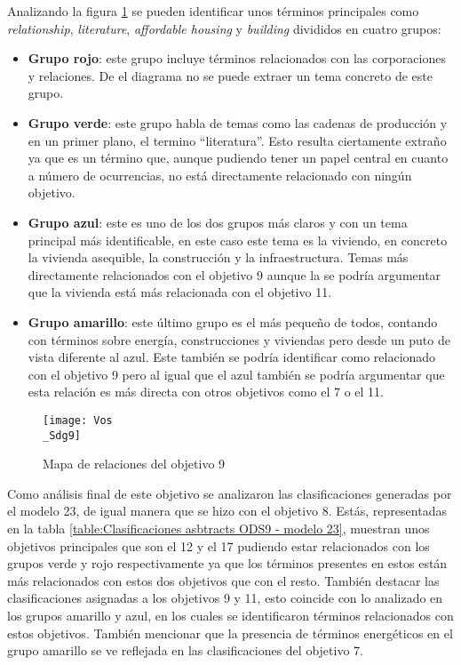 Analizando la figura \cref{Mapa de relaciones del objetivo 9} se pueden identificar unos
términos principales como \textit{relationship}, \textit{literature},
\textit{affordable housing} y \textit{building} divididos en cuatro grupos:
\begin{itemize}
    \item \textbf{Grupo rojo}: este grupo incluye términos relacionados con las
    corporaciones y relaciones. De el diagrama no se puede extraer un tema
    concreto de este grupo. 
    \item \textbf{Grupo verde}: este grupo habla de temas como las cadenas de
    producción y en un primer plano, el termino ``literatura''. Esto resulta
    ciertamente extraño ya que es un término que, aunque pudiendo tener un papel
    central en cuanto a número de ocurrencias, no está directamente relacionado
    con ningún objetivo.
    \item \textbf{Grupo azul}: este es uno de los dos grupos más claros y con un
    tema principal más identificable, en este caso este tema es la viviendo, en
    concreto la vivienda asequible, la construcción y la infraestructura. Temas
    más directamente relacionados con el objetivo 9 aunque la se podría
    argumentar que la vivienda está más relacionada con el objetivo 11.
    \item \textbf{Grupo amarillo}: este último grupo es el más pequeño de todos,
    contando con términos sobre energía, construcciones y viviendas pero desde
    un puto de vista diferente al azul. Este también se podría identificar como
    relacionado con el objetivo 9 pero al igual que el azul también se podría
    argumentar que esta relación es más directa con otros objetivos como el 7
    o el 11.
\end{itemize}


\begin{figure}[H]
    \centering
    \texttt{[image: Vos\\\_Sdg9]}
    \captionsetup{justification=centering}
    \caption{Mapa de relaciones del objetivo 9}
    \label{Mapa de relaciones del objetivo 9}
\end{figure}

Como análisis final de este objetivo se analizaron las clasificaciones generadas
por el modelo 23, de igual manera que se hizo con el objetivo 8. Estás,
representadas en la tabla \cref{table:Clasificaciones asbtracts ODS9 - modelo
23}, muestran unos objetivos principales que son el 12 y el 17 pudiendo estar
relacionados con los grupos verde y rojo respectivamente ya que los términos
presentes en estos están más relacionados con estos dos objetivos que con el
resto. También destacar las clasificaciones asignadas a los objetivos 9 y 11,
esto coincide con lo analizado en los grupos amarillo y azul, en los cuales se
identificaron términos relacionados con estos objetivos. También mencionar que la
presencia de términos energéticos en el grupo amarillo se ve reflejada en las
clasificaciones del objetivo 7. 

